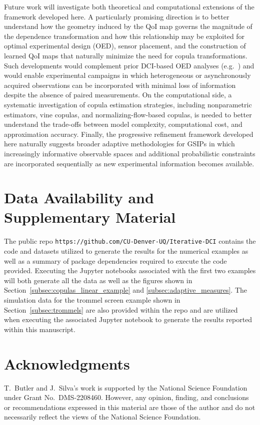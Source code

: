 \documentclass{article}
\newcounter{example}[section]
\begin{document}
Future work will investigate both theoretical and computational extensions of the framework developed here.
A particularly promising direction is to better understand how the geometry induced by the QoI map governs the magnitude of the dependence transformation and how this relationship may be exploited for optimal experimental design (OED), sensor placement, and the construction of learned QoI maps that naturally minimize the need for copula transformations.
Such developments would complement prior DCI-based OED analyses (e.g.~\cite{WWJ17, BJP+26}) and would enable experimental campaigns in which heterogeneous or asynchronously acquired observations can be incorporated with minimal loss of information despite the absence of paired measurements.
On the computational side, a systematic investigation of copula estimation strategies, including nonparametric estimators, vine copulas, and normalizing-flow-based copulas, is needed to better understand the trade-offs between model complexity, computational cost, and approximation accuracy.
Finally, the progressive refinement framework developed here naturally suggests broader adaptive methodologies for GSIPs in which increasingly informative observable spaces and additional probabilistic constraints are incorporated sequentially as new experimental information becomes available.

\section{Data Availability and Supplementary Material}\label{sec:supplementary}

The public repo \verb|https://github.com/CU-Denver-UQ/Iterative-DCI| contains the code and datasets utilized to generate the results for the numerical examples as well as a summary of package dependencies required to execute the code provided.
Executing the Jupyter notebooks associated with the first two examples will both generate all the data as well as the figures shown in Section~\ref{subsec:copulas_linear_example} and \ref{subsec:adaptive_measures}.
The simulation data for the trommel screen example shown in Section~\ref{subsec:trommels} are also provided within the repo and are utilized when executing the associated Jupyter notebook to generate the results reported within this manuscript.

\section{Acknowledgments}\label{sec:acknowledgments}
T.~Butler and J.~Silva's work is supported by the National Science Foundation under Grant No.~DMS-2208460.
However, any opinion, finding, and conclusions or recommendations expressed in this material are those of the author and do not necessarily reflect the views of the National Science Foundation.
\end{document}
